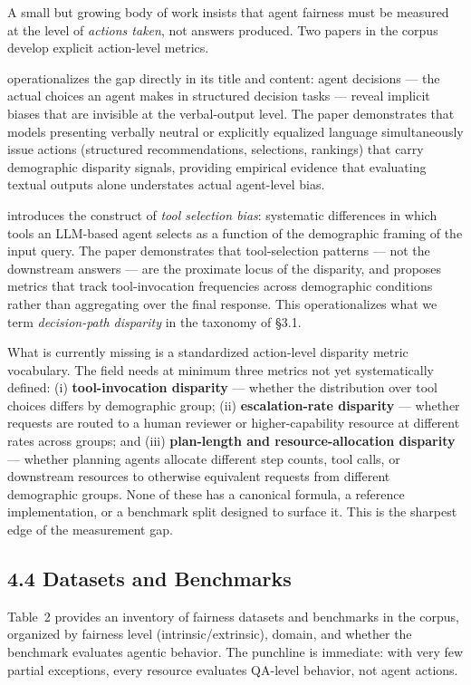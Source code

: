 \documentclass[sigconf,nonacm]{acmart}
\begin{document}
A small but growing body of work insists that agent fairness must be measured at the level of \emph{actions taken}, not answers produced. Two papers in the corpus develop explicit action-level metrics.

\cite{li2025actions} operationalizes the gap directly in its title and content: agent decisions — the actual choices an agent makes in structured decision tasks — reveal implicit biases that are invisible at the verbal-output level. The paper demonstrates that models presenting verbally neutral or explicitly equalized language simultaneously issue actions (structured recommendations, selections, rankings) that carry demographic disparity signals, providing empirical evidence that evaluating textual outputs alone understates actual agent-level bias.

\cite{blankenstein2025biasbusters} introduces the construct of \emph{tool selection bias}: systematic differences in which tools an LLM-based agent selects as a function of the demographic framing of the input query. The paper demonstrates that tool-selection patterns — not the downstream answers — are the proximate locus of the disparity, and proposes metrics that track tool-invocation frequencies across demographic conditions rather than aggregating over the final response. This operationalizes what we term \emph{decision-path disparity} in the taxonomy of §3.1.

What is currently missing is a standardized action-level disparity metric vocabulary. The field needs at minimum three metrics not yet systematically defined: (i) \textbf{tool-invocation disparity} — whether the distribution over tool choices differs by demographic group; (ii) \textbf{escalation-rate disparity} — whether requests are routed to a human reviewer or higher-capability resource at different rates across groups; and (iii) \textbf{plan-length and resource-allocation disparity} — whether planning agents allocate different step counts, tool calls, or downstream resources to otherwise equivalent requests from different demographic groups. None of these has a canonical formula, a reference implementation, or a benchmark split designed to surface it. This is the sharpest edge of the measurement gap.

\subsection{4.4 Datasets and Benchmarks}

Table~2 provides an inventory of fairness datasets and benchmarks in the corpus, organized by fairness level (intrinsic/extrinsic), domain, and whether the benchmark evaluates agentic behavior. The punchline is immediate: with very few partial exceptions, every resource evaluates QA-level behavior, not agent actions.
\end{document}
